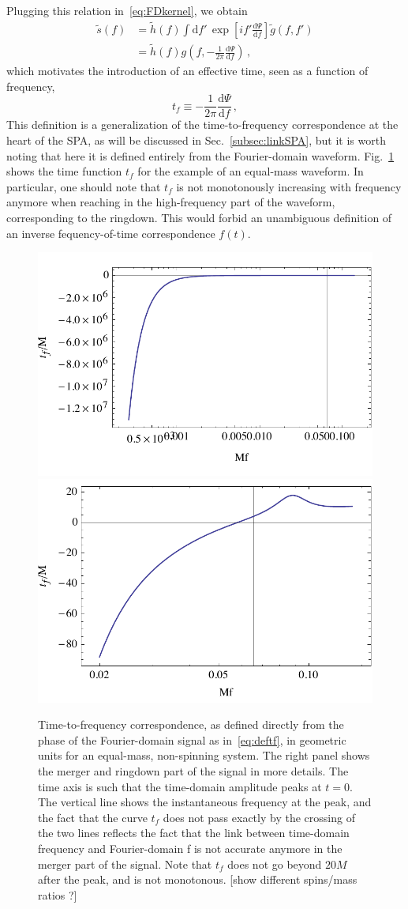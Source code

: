 \documentclass[aps,showpacs,%
prd,superscriptaddress,nofootinbib]{revtex4}
\newcommand{\be}{\begin{equation}}
\newcommand{\ee}{\end{equation}}
\newcommand\ud{{\mathrm{d}}}
\newcommand{\nn}{\nonumber}
\newcommand{\tf}{t_{f}}
\begin{document}
Plugging this relation in~\eqref{eq:FDkernel}, we obtain
\begin{align}
	\tilde{s}(f) &= \tilde{h}(f) \int \ud f' \, \exp\left[ i f' \frac{\ud \Psi}{\ud f} \right] \tilde{g}(f,f') \nn\\
	&= \tilde{h}(f) g\left( f, -\frac{1}{2\pi} \frac{\ud \Psi}{\ud f} \right) \,,
\end{align}
which motivates the introduction of an effective time, seen as a function of frequency,
\be\label{eq:deftf}
	\tf \equiv -\frac{1}{2\pi} \frac{\ud \Psi}{\ud f} \,,
\ee
This definition is a generalization of the time-to-frequency correspondence at the heart of the SPA, as will be discussed in Sec.~\ref{subsec:linkSPA}, but it is worth noting that here it is defined entirely from the Fourier-domain waveform. Fig.~\ref{fig:tf} shows the time function $\tf$ for the example of an equal-mass waveform. In particular, one should note that $\tf$ is not monotonously increasing with frequency anymore when reaching in the high-frequency part of the waveform, corresponding to the ringdown. This would forbid an unambiguous definition of an inverse fequency-of-time correspondence $f(t)$. 

\begin{figure}
  \centering
  \includegraphics[width=.48\linewidth]{plots/tf.pdf}
  \hspace{0.2cm}
  \includegraphics[width=.48\linewidth]{plots/tfzoom.pdf}
  \caption{Time-to-frequency correspondence, as defined directly from the phase of the Fourier-domain signal as in~\eqref{eq:deftf}, in geometric units for an equal-mass, non-spinning system. The right panel shows the merger and ringdown part of the signal in more details. The time axis is such that the time-domain amplitude peaks at $t=0$. The vertical line shows the instantaneous frequency at the peak, and the fact that the curve $t_{f}$ does not pass exactly by the crossing of the two lines reflects the fact that the link between time-domain frequency and Fourier-domain f is not accurate anymore in the merger part of the signal. Note that $t_{f}$ does not go beyond $20M$ after the peak, and is not monotonous. [show different spins/mass ratios ?]}
  \label{fig:tf}
\end{figure}
\end{document}
